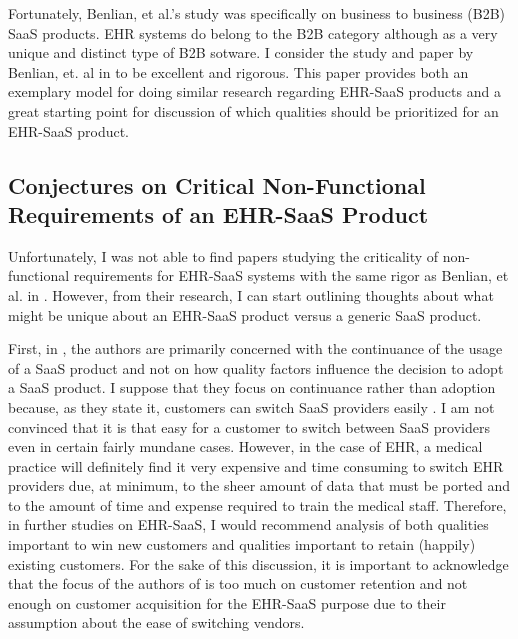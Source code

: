 \documentclass[10pt]{article}
\begin{document}
Fortunately, Benlian, et al.'s study was specifically on business to business (B2B) SaaS products. 
EHR systems do belong to the B2B category although as a very unique and distinct type of B2B sotware.
I consider the study and paper by Benlian, et. al in \cite{saasqual} to be excellent and rigorous.
This paper provides both an exemplary model for doing similar research regarding EHR-SaaS products and a great starting point for discussion of which qualities should be prioritized for an EHR-SaaS product.


\subsection{Conjectures on Critical Non-Functional Requirements of an EHR-SaaS Product}
\label{sec:Critical-EHR-Ilities}

Unfortunately, I was not able to find papers studying the criticality of non-functional requirements for EHR-SaaS systems with the same rigor as Benlian, et al. in \cite{saasqual}.
However, from their research, I can start outlining thoughts about what might be unique about an EHR-SaaS product versus a generic SaaS product.

First, in \cite{saasqual}, the authors are primarily concerned with the continuance of the usage of a SaaS product and not on how quality factors influence the decision to adopt a SaaS product.
I suppose that they focus on continuance rather than adoption because, as they state it, customers can switch SaaS providers easily \cite{saasqual}. 
I am not convinced that it is that easy for a customer to switch between SaaS providers even in certain fairly mundane cases.
However, in the case of EHR, a medical practice will definitely find it very expensive and time consuming to switch EHR providers due, at minimum, to the sheer amount of data that must be ported and to the amount of time and expense required to train the medical staff.
Therefore, in further studies on EHR-SaaS, I would recommend analysis of both qualities important to win new customers and qualities important to retain (happily) existing customers.
For the sake of this discussion, it is important to acknowledge that the focus of the authors of \cite{saasqual} is too much on customer retention and not enough on customer acquisition for the EHR-SaaS purpose due to their assumption about the ease of switching vendors.
\end{document}
